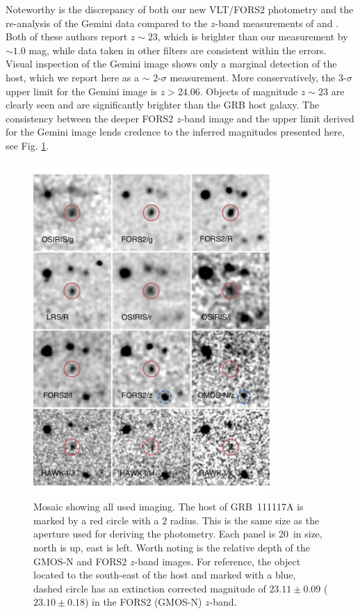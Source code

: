\documentclass[referee]{aa}
\begin{document}
Noteworthy is the discrepancy of both our new VLT/FORS2 photometry and the
re-analysis of the Gemini data compared to the $z$-band measurements of
\citet{Margutti2012} and \citet{Sakamoto2013}. Both of these authors report $z
\sim 23$, which is brighter than our measurement by $\sim 1.0$ mag, while data
taken in other filters are consistent within the errors. Visual inspection of
the Gemini image shows only a marginal detection of the host, which we report
here as a $\sim$ 2-$\sigma$ measurement. More conservatively, the 3-$\sigma$
upper limit for the Gemini image is $z > 24.06$. Objects of magnitude $z \sim
23$ are clearly seen and are significantly brighter than the GRB host galaxy.
The consistency between the deeper FORS2 $z$-band image and the upper limit
derived for the Gemini image lends credence to the inferred magnitudes presented
here, see Fig. \ref{fig:photplot}.

\begin{figure}
	\centering \includegraphics[width=9cm]{figures/photometry_mosaic.pdf}
\caption{Mosaic showing all used imaging. The host of GRB~111117A is marked by
	a red circle with a 2 radius. This is the same size as the aperture used
	for deriving the photometry. Each panel is 20\arcsec~in size, north is up, east
	is left. Worth noting is the relative depth of the GMOS-N and FORS2 $z$-band
	images. For reference, the object located to the south-east of the host and
	marked with a blue, dashed circle has an extinction corrected magnitude of
	$23.11 \pm 0.09$ ($23.10 \pm 0.18$) in the FORS2 (GMOS-N) $z$-band.}
\label{fig:photplot}
\end{figure}
\end{document}
